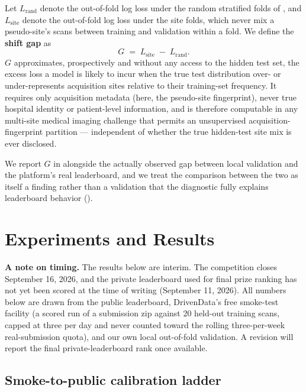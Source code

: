 \documentclass[10pt]{article}
\newcommand{\shiftgap}{\ensuremath{G}}
\newcommand{\lrand}{\ensuremath{L_{\text{rand}}}}
\newcommand{\lsite}{\ensuremath{L_{\text{site}}}}
\begin{document}
Let \lrand{} denote the out-of-fold log loss under the random stratified folds of , and \lsite{} denote the out-of-fold log loss under the site folds, which never mix a pseudo-site's scans between training and validation within a fold. We define the \textbf{shift gap} as
\begin{equation}
\shiftgap \;=\; \lsite \;-\; \lrand.
\label{eq:shiftgap}
\end{equation}
\shiftgap{} approximates, prospectively and without any access to the hidden test set, the excess loss a model is likely to incur when the true test distribution over- or under-represents acquisition sites relative to their training-set frequency. It requires only acquisition metadata (here, the pseudo-site fingerprint), never true hospital identity or patient-level information, and is therefore computable in any multi-site medical imaging challenge that permits an unsupervised acquisition-fingerprint partition --- independent of whether the true hidden-test site mix is ever disclosed.

We report \shiftgap{} in  alongside the actually observed gap between local validation and the platform's real leaderboard, and we treat the comparison between the two as itself a finding rather than a validation that the diagnostic fully explains leaderboard behavior ().

\section{Experiments and Results}
\label{sec:results}

\textbf{A note on timing.} The results below are interim. The competition closes September 16, 2026, and the private leaderboard used for final prize ranking has not yet been scored at the time of writing (September 11, 2026). All numbers below are drawn from the public leaderboard, DrivenData's free smoke-test facility (a scored run of a submission zip against 20 held-out training scans, capped at three per day and never counted toward the rolling three-per-week real-submission quota), and our own local out-of-fold validation. A revision will report the final private-leaderboard rank once available.

\subsection{Smoke-to-public calibration ladder}
\end{document}
